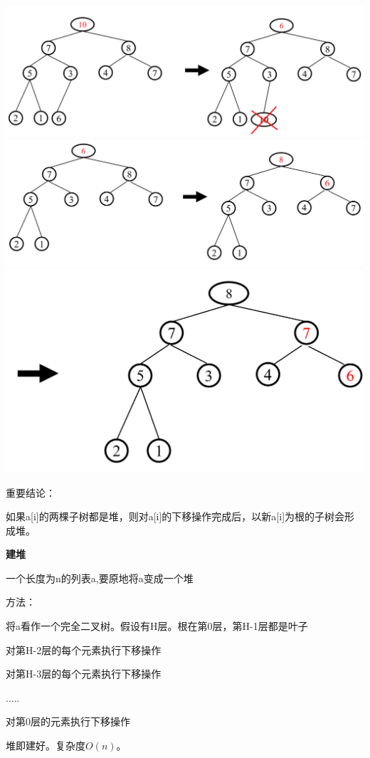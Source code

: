 \documentclass[10pt,UTF8,a4paper]{ctexart}
\begin{document}
\begin{multicols}{3}
\includegraphics[width=\columnwidth]{images/删除堆顶元素1.png}
\includegraphics[width=\columnwidth]{images/删除堆顶元素2.png}
\includegraphics[width=.5\columnwidth]{images/删除堆顶元素3.png}



重要结论：

如果a[i]的两棵子树都是堆，则对a[i]的下移操作完成后，以新a[i]为根的子树会形成堆。

\textbf{建堆}

一个长度为n的列表a,要原地将a变成一个堆

方法：

将a看作一个完全二叉树。假设有H层。根在第0层，第H-1层都是叶子

对第H-2层的每个元素执行下移操作

对第H-3层的每个元素执行下移操作

.....

对第0层的元素执行下移操作

堆即建好。复杂度$O(n)$。


\end{multicols}
\end{document}
